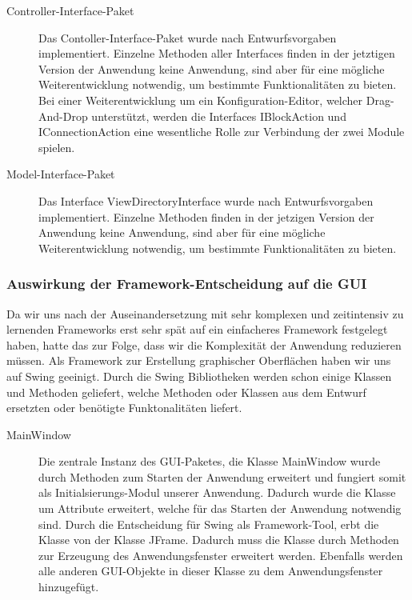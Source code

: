 \documentclass[parskip=full]{scrartcl}
\begin{document}
\begin{description}
\item[Controller-Interface-Paket]

Das Contoller-Interface-Paket wurde nach Entwurfsvorgaben implementiert. Einzelne Methoden aller Interfaces finden in der jetztigen Version der Anwendung keine Anwendung, sind aber für eine mögliche Weiterentwicklung notwendig, um bestimmte Funktionalitäten zu bieten. Bei einer Weiterentwicklung um ein Konfiguration-Editor, welcher Drag-And-Drop unterstützt, werden die Interfaces IBlockAction und IConnectionAction eine wesentliche Rolle zur Verbindung der zwei Module spielen.

\item[Model-Interface-Paket]

Das Interface ViewDirectoryInterface wurde nach Entwurfsvorgaben implementiert. Einzelne Methoden finden in der jetzigen Version der Anwendung keine Anwendung, sind aber für eine mögliche Weiterentwicklung notwendig, um bestimmte Funktionalitäten zu bieten.
\end{description}



\subsubsection{Auswirkung der Framework-Entscheidung auf die GUI}

Da wir uns nach der Auseinandersetzung mit sehr komplexen und zeitintensiv zu lernenden Frameworks erst sehr spät auf ein einfacheres Framework festgelegt haben, hatte das zur Folge, dass wir die Komplexität der Anwendung reduzieren müssen.
Als Framework zur Erstellung graphischer Oberflächen haben wir uns auf Swing geeinigt. Durch die Swing Bibliotheken werden schon einige Klassen und Methoden geliefert, welche Methoden oder Klassen aus dem Entwurf ersetzten oder benötigte Funktonalitäten liefert.

\begin{description}
\item[MainWindow] Die zentrale Instanz des GUI-Paketes, die Klasse MainWindow wurde durch Methoden zum Starten der Anwendung erweitert und fungiert somit als Initialsierungs-Modul unserer Anwendung. Dadurch wurde die Klasse um Attribute erweitert, welche für das Starten der Anwendung notwendig sind. Durch die Entscheidung für Swing als Framework-Tool, erbt die Klasse von der Klasse JFrame. Dadurch muss die Klasse durch Methoden zur Erzeugung des Anwendungsfenster erweitert werden. Ebenfalls werden alle anderen GUI-Objekte in dieser Klasse zu dem Anwendungsfenster hinzugefügt. 
\end{description}
\end{document}
